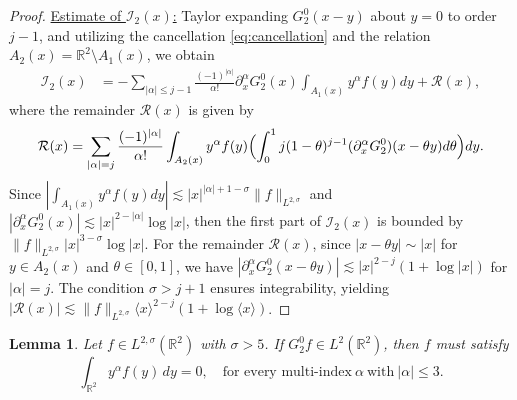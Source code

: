 \documentclass[reqno]{amsart}
\newtheorem{lemma}[theorem]{Lemma}
\numberwithin{equation}{section}
\begin{document}
\begin{proof}
 
\underline{Estimate of $\mathcal{I}_2(x)$:} Taylor expanding $G_2^0(x-y)$ about $y=0$ to order $j-1$, and utilizing the cancellation \eqref{eq:cancellation} and the relation $A_2(x) = \mathbb{R}^2 \setminus A_1(x)$, we obtain
	\begin{align*}
	\mathcal{I}_2(x) 
    &=-\sum_{|\alpha|\le j-1} \frac{(-1)^{|\alpha|}}{\alpha!}\partial_x^\alpha G_2^0(x)\int_{A_1(x)} y^\alpha f(y)dy + \mathcal{R}(x),
	\end{align*}
	where the remainder $\mathcal{R}(x)$ is given by
	\[
	\mathcal{R}(x) = \sum_{|\alpha|=j} \frac{(-1)^{|\alpha|}}{\alpha!} \int_{A_2(x)}  y^\alpha f(y) \Bigl( \int_0^1 j(1-\theta)^{j-1} (\partial_x^\alpha G_2^0)(x-\theta y) d\theta \Bigr) dy.
	\]
	Since $| \int_{A_1(x)} y^\alpha f(y) dy| \lesssim |x|^{|\alpha|+1-\sigma} \|f\|_{L^{2,\sigma}}$ and $|\partial_x^\alpha G_2^0(x)| \lesssim |x|^{2-|\alpha|} \log|x|$,
then the first part of $\mathcal{I}_2(x)$ is bounded by
$ \|f\|_{L^{2,\sigma}} |x|^{3-\sigma} \log|x|$.
	For the remainder $\mathcal{R}(x)$, since $|x - \theta y| \sim |x|$ for $y\in A_2(x)$ and $\theta\in[0,1]$, we have $|\partial_x^\alpha G_2^0(x-\theta y)| \lesssim |x|^{2-j}(1+\log|x|)$ for $|\alpha|=j$. The condition $\sigma > j+1$ ensures integrability, yielding $|\mathcal{R}(x)| \lesssim \|f\|_{L^{2,\sigma}} \langle x \rangle^{2-j}(1+\log\langle x \rangle)$.
\end{proof}
\begin{lemma} \label{S_5canc}
	Let $f \in L^{2,\sigma}(\mathbb{R}^2)$ with $\sigma > 5$. If $G_2^0 f \in L^2(\mathbb{R}^2)$, then $f$ must satisfy 
 \[
\int_{\mathbb{R}^2} y^\alpha f(y) \, dy = 0, \quad \text{for every multi-index}  \   \alpha \  \text{with}\  |\alpha| \leq 3.
\]
\end{lemma}
\end{document}
